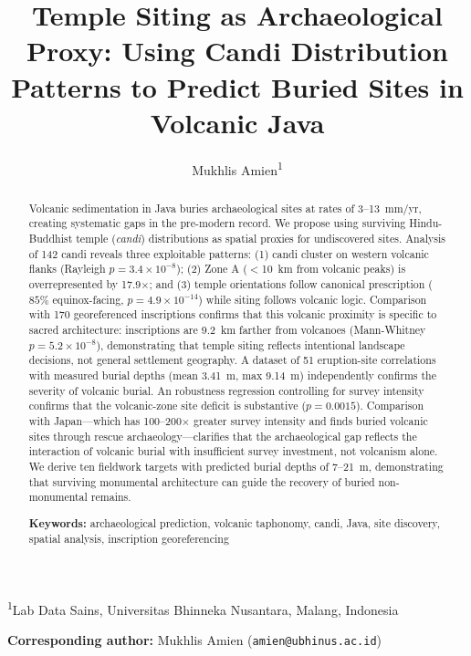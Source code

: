 \documentclass[12pt,a4paper]{article}
\title{Temple Siting as Archaeological Proxy: Using Candi Distribution Patterns to Predict Buried Sites in Volcanic Java}
\author{Mukhlis Amien\textsuperscript{1}}
\date{}
\begin{document}
\maketitle

\noindent\textsuperscript{1}Lab Data Sains, Universitas Bhinneka Nusantara, Malang, Indonesia

\vspace{1em}
\noindent\textbf{Corresponding author:} Mukhlis Amien (\texttt{amien@ubhinus.ac.id})

\begin{abstract}
Volcanic sedimentation in Java buries archaeological sites at rates of 3--13~mm/yr, creating systematic gaps in the pre-modern record. We propose using surviving Hindu-Buddhist temple (\emph{candi}) distributions as spatial proxies for undiscovered sites. Analysis of 142 candi reveals three exploitable patterns: (1) candi cluster on western volcanic flanks (Rayleigh $p=3.4\times10^{-8}$); (2) Zone A ($<$10~km from volcanic peaks) is overrepresented by 17.9$\times$; and (3) temple orientations follow canonical prescription ($85\%$ equinox-facing, $p=4.9\times10^{-14}$) while siting follows volcanic logic. Comparison with 170 georeferenced inscriptions confirms that this volcanic proximity is specific to sacred architecture: inscriptions are 9.2~km farther from volcanoes (Mann-Whitney $p=5.2\times10^{-8}$), demonstrating that temple siting reflects intentional landscape decisions, not general settlement geography. A dataset of 51 eruption-site correlations with measured burial depths (mean 3.41~m, max 9.14~m) independently confirms the severity of volcanic burial. An robustness regression controlling for survey intensity confirms that the volcanic-zone site deficit is substantive ($p=0.0015$). Comparison with Japan---which has 100--200$\times$ greater survey intensity and finds buried volcanic sites through rescue archaeology---clarifies that the archaeological gap reflects the interaction of volcanic burial with insufficient survey investment, not volcanism alone. We derive ten fieldwork targets with predicted burial depths of 7--21~m, demonstrating that surviving monumental architecture can guide the recovery of buried non-monumental remains.

\vspace{0.5em}
\noindent\textbf{Keywords:} archaeological prediction, volcanic taphonomy, candi, Java, site discovery, spatial analysis, inscription georeferencing
\end{abstract}

\newpage
\end{document}

